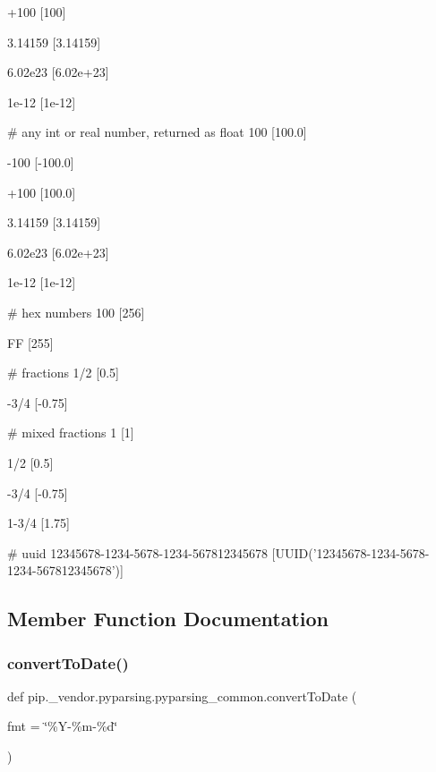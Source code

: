 \begin{DoxyVerb}
    +100
    [100]

    3.14159
    [3.14159]

    6.02e23
    [6.02e+23]

    1e-12
    [1e-12]

    # any int or real number, returned as float
    100
    [100.0]

    -100
    [-100.0]

    +100
    [100.0]

    3.14159
    [3.14159]

    6.02e23
    [6.02e+23]

    1e-12
    [1e-12]

    # hex numbers
    100
    [256]

    FF
    [255]

    # fractions
    1/2
    [0.5]

    -3/4
    [-0.75]

    # mixed fractions
    1
    [1]

    1/2
    [0.5]

    -3/4
    [-0.75]

    1-3/4
    [1.75]

    # uuid
    12345678-1234-5678-1234-567812345678
    [UUID('12345678-1234-5678-1234-567812345678')]
\end{DoxyVerb}
 

\subsection{Member Function Documentation}
\mbox{\label{classpip_1_1__vendor_1_1pyparsing_1_1pyparsing__common_a4e94dcf87ca3c72e569ed1f350e1557e}} 
\subsubsection{\texorpdfstring{convert\+To\+Date()}{convertToDate()}}
{\footnotesize\ttfamily def pip.\+\_\+vendor.\+pyparsing.\+pyparsing\+\_\+common.\+convert\+To\+Date (\begin{DoxyParamCaption}\item[{}]{fmt = {\ttfamily \char`\"{}\%Y-\/\%m-\/\%d\char`\"{}} }\end{DoxyParamCaption})\hspace{0.3cm}{\ttfamily [static]}}

